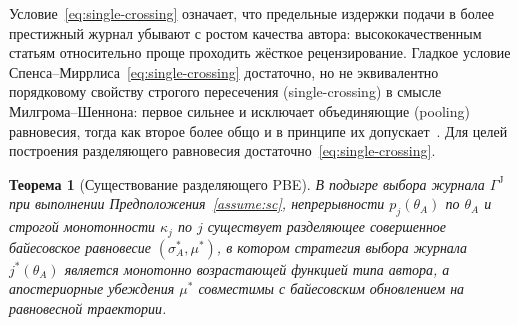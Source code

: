 \documentclass[12pt,a4paper]{article}
\newtheorem{theorem}{Теорема}
\theoremstyle{definition}
\begin{document}
Условие~\eqref{eq:single-crossing} означает, что предельные издержки
подачи в более престижный журнал убывают с ростом качества автора:
высококачественным статьям относительно проще проходить жёсткое
рецензирование. Гладкое условие
Спенса--Миррлиса~\eqref{eq:single-crossing} достаточно, но не
эквивалентно порядковому свойству строгого пересечения
(single-crossing) в смысле Милгрома--Шеннона: первое сильнее и
исключает объединяющие (pooling) равновесия, тогда как второе более
общо и в принципе их допускает~\citep{edlin1998}. Для целей
построения разделяющего равновесия достаточно~\eqref{eq:single-crossing}.

\begin{theorem}[Существование разделяющего PBE]
  \label{thm:pbe-journal}
  В подыгре выбора журнала $\Gamma^{\mathrm{J}}$ при выполнении
  Предположения~\ref{assume:sc}, непрерывности $p_j(\theta_A)$ по
  $\theta_A$ и строгой монотонности $\kappa_j$ по $j$ существует
  разделяющее совершенное байесовское равновесие $(\sigma_A^{*},
  \mu^{*})$, в котором стратегия выбора журнала $j^{*}(\theta_A)$
  является монотонно возрастающей функцией типа автора, а
  апостериорные убеждения $\mu^{*}$ совместимы с байесовским
  обновлением на равновесной траектории.
\end{theorem}
\end{document}
